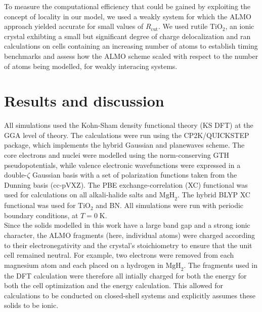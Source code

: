 \documentclass[aps,prb,twocolumn,amsmath,amssymb,superscriptaddress,longbibliography]{revtex4-1}
\begin{document}
To measure the computational efficiency that could be gained by exploiting the concept of locality in our model, we used a weakly system for which the ALMO approach yielded accurate for small values of $R_{\text{cut}}$. We used rutile $\text{TiO}_{2}$, an ionic crystal exhibting a small but significant degree of charge delocalization and ran calculations on cells containing an increasing number of atoms to establish timing benchmarks and assess how the ALMO scheme scaled with respect to the number of atoms being modelled, for weakly interacing systems.  


\section*{Results and discussion}
 
All simulations used the Kohn-Sham density functional theory (KS DFT) at the GGA level of theory. 
The calculations were run using the CP2K/QUICKSTEP package\cite{cp2k}, which implements the hybrid Gaussian and planewaves scheme\cite{gpw}. 
The core electrons and nuclei were modelled using the norm-conserving GTH pseudopotentials\cite{gth1,gth2}, while valence electronic wavefunctions were expressed in a $\text{double-}\zeta$  Gaussian basis \cite{gaussian} with a set of polarization functions taken from the Dunning basis (cc-pVXZ)\cite{pol,qs}.
The PBE exchange-correlation (XC) functional\cite{pbe} was used for calculations on all alkali-halide salts and $\text{MgH}_{2}$. 
The hybrid BLYP XC functional\cite{becke,lyp} was used for $\text{TiO}_{2}$ and BN. 
All simulations were run with periodic boundary conditions, at $T = 0\;\text{K}$.\\

Since the solids modelled in this work have a large band gap and a strong ionic character, the ALMO fragments (here, individual atoms) were charged according to their electronegativity and the crystal's stoichiometry to ensure that the unit cell remained neutral. 
For example, two electrons were removed from each magnesium atom and each placed on a hydrogen in $\text{MgH}_{2}$. 
The fragments used in the DFT calculation were therefore all intially charged for both the energy for both the cell optimization and the energy calculation.
This allowed for calculations to be conducted on closed-shell systems and explicitly assumes these solids to be ionic.\\  
\end{document}
